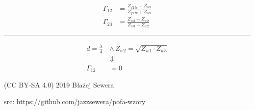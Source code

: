 \documentclass[12pt]{article}
\newenvironment{bottompar}{\par\vspace*{\fill}}{\clearpage}
\newcommand{\grayrule}{{\color{lightgray} \hrule}}
\begin{document}
\begin{multicols}{3}
\begin{equation*}
    \begin{split}
        \Gamma_{12} &= \frac{Z_{f2 \, tr} - Z_{w1}}{Z_{f2 \, tr} + Z_{w1}} \\
        \Gamma_{23} &= \frac{Z_{w3} - Z_{w2}}{Z_{w3} + Z_{w2}}
    \end{split}
\end{equation*}

\grayrule

\begin{equation*}
    \begin{split}
        d = \frac{\lambda}{4} \, &\wedge \, Z_{w2} = \sqrt{Z_{w1} \cdot Z_{w3}} \\
                                                  &\Downarrow \\
        \Gamma_{12} &= 0
    \end{split}
\end{equation*}

\end{multicols}

\begin{bottompar}
    {\footnotesize \ttfamily (CC BY-SA 4.0) 2019 Błażej Sewera \par
    src: https://github.com/jazzsewera/pofa-wzory}
\end{bottompar}

\end{document}
